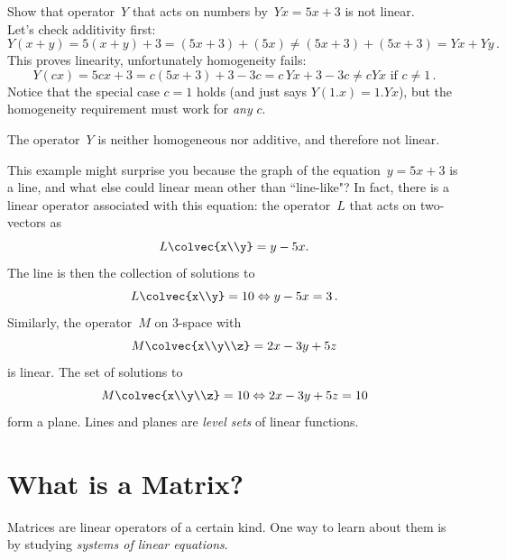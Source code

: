 \begin{example} Show that operator~$Y$ that acts on numbers by~$Yx=5x+3$ is not linear. \\ 
Let's check additivity first:
\[
Y(x+y)= 5(x+y)+3=(5x+3)+(5x)\neq (5x+3)+(5x+3)=Yx+Yy\, .
\]
This proves linearity, unfortunately homogeneity fails:
\[Y(cx)=5cx+3=c (5x+3) +3 -3c= c\, Yx +3-3c\neq cYx \mbox{ if } c\neq1\, .\]
Notice that the special case $c=1$ holds (and just says $Y(1.x)=1.Yx$), but the homogeneity
requirement must work for {\itshape any} $c$. 

The operator~$Y$ is neither homogeneous nor additive, and therefore not linear.
\end{example}

This example might surprise you because the graph of the equation~$y=5x+3$ is a line, and what else could linear mean other than ``line-like"? In fact, there is a linear operator associated with this equation: 
the operator~$L$ that acts on two-vectors as 
\[L\colvec{x\\y}=y-5x.\] 
The line is then the collection of solutions to 
\[L\colvec{x\\y}=10 \Leftrightarrow y-5x=3 \,.\] 
Similarly, the  operator~$M$ on 3-space with 
\[M\colvec{x\\y\\z}=2x-3y+5z\] 
is linear. The set of solutions to 
\[M\colvec{x\\y\\z}=10 \Leftrightarrow 2x-3y+5z=10\] 
form a plane. Lines and planes are {\itshape level sets} of linear functions. 






\noindent
\section{What is a Matrix?}
Matrices are linear operators of a certain kind.
One way to learn about them is by studying {\itshape systems of  linear equations}. 


